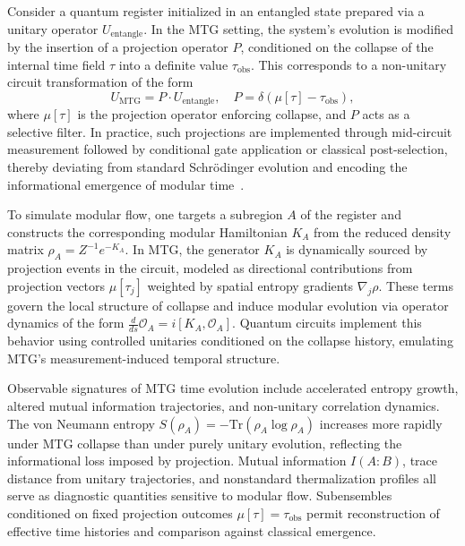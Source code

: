\documentclass[11pt]{article}
\begin{document}
Consider a quantum register initialized in an entangled state prepared via a unitary operator \( U_{\text{entangle}} \). In the MTG setting, the system's evolution is modified by the insertion of a projection operator \( P \), conditioned on the collapse of the internal time field \( \tau \) into a definite value \( \tau_{\text{obs}} \). This corresponds to a non-unitary circuit transformation of the form
\begin{equation}
U_{\text{MTG}} = P \cdot U_{\text{entangle}}, \quad P = \delta(\mu[\tau] - \tau_{\text{obs}}),
\end{equation}
where \( \mu[\tau] \) is the projection operator enforcing collapse, and \( P \) acts as a selective filter. In practice, such projections are implemented through mid-circuit measurement followed by conditional gate application or classical post-selection, thereby deviating from standard Schr\"odinger evolution and encoding the informational emergence of modular time~\cite{jordan2012quantum}.

To simulate modular flow, one targets a subregion \( A \) of the register and constructs the corresponding modular Hamiltonian \( K_A \) from the reduced density matrix \( \rho_A = Z^{-1} e^{-K_A} \). In MTG, the generator \( K_A \) is dynamically sourced by projection events in the circuit, modeled as directional contributions from projection vectors \( \mu[\tau_j] \) weighted by spatial entropy gradients \( \nabla_j \rho \). These terms govern the local structure of collapse and induce modular evolution via operator dynamics of the form \( \frac{d}{ds} \mathcal{O}_A = i [K_A, \mathcal{O}_A] \). Quantum circuits implement this behavior using controlled unitaries conditioned on the collapse history, emulating MTG’s measurement-induced temporal structure.

Observable signatures of MTG time evolution include accelerated entropy growth, altered mutual information trajectories, and non-unitary correlation dynamics. The von Neumann entropy \( S(\rho_A) = -\mathrm{Tr}(\rho_A \log \rho_A) \) increases more rapidly under MTG collapse than under purely unitary evolution, reflecting the informational loss imposed by projection. Mutual information \( I(A:B) \), trace distance from unitary trajectories, and nonstandard thermalization profiles all serve as diagnostic quantities sensitive to modular flow. Subensembles conditioned on fixed projection outcomes \( \mu[\tau] = \tau_{\text{obs}} \) permit reconstruction of effective time histories and comparison against classical emergence.
\end{document}
